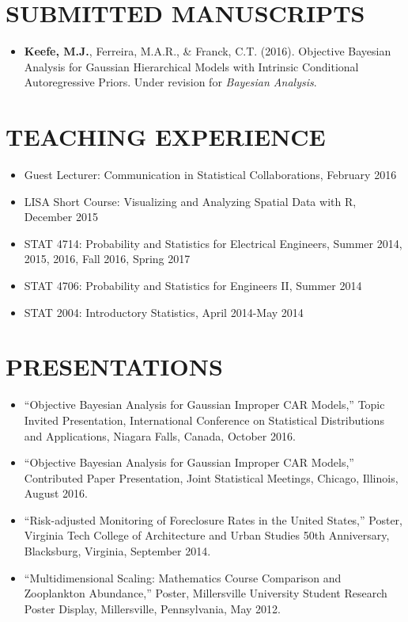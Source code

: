 \documentclass[10pt]{article}
\begin{document}
\section*{SUBMITTED MANUSCRIPTS}
\begin{itemize}
\item[] \textbf{Keefe, M.J.}, Ferreira, M.A.R., \& Franck, C.T. (2016). Objective Bayesian Analysis for Gaussian Hierarchical Models with Intrinsic Conditional Autoregressive Priors. Under revision for \textit{Bayesian Analysis}.
\end{itemize}

\section*{TEACHING EXPERIENCE}
\begin{itemize}
\item Guest Lecturer: Communication in Statistical Collaborations, February 2016
\item LISA Short Course: Visualizing and Analyzing Spatial Data with R, December 2015
\item STAT 4714: Probability and Statistics for Electrical Engineers, Summer 2014, 2015, 2016, Fall 2016, Spring 2017
\item STAT 4706: Probability and Statistics for Engineers II, Summer 2014
\item STAT 2004: Introductory Statistics, April 2014-May 2014
\end{itemize}


\section*{PRESENTATIONS}
\begin{itemize}

\item[] ``Objective Bayesian Analysis for Gaussian Improper CAR Models,'' Topic Invited Presentation, International Conference on Statistical Distributions and Applications, Niagara Falls, Canada, October 2016.

\item[] ``Objective Bayesian Analysis for Gaussian Improper CAR Models,'' Contributed Paper Presentation, Joint Statistical Meetings, Chicago, Illinois, August 2016.

\item[] ``Risk-adjusted Monitoring of Foreclosure Rates in the United States,'' Poster, Virginia Tech College of Architecture and Urban Studies 50th Anniversary, Blacksburg, Virginia, September 2014.

\item[]  ``Multidimensional Scaling: Mathematics Course Comparison and Zooplankton Abundance,'' Poster, Millersville University Student Research Poster Display, Millersville, Pennsylvania, May 2012.

\end{itemize}
\end{document}
